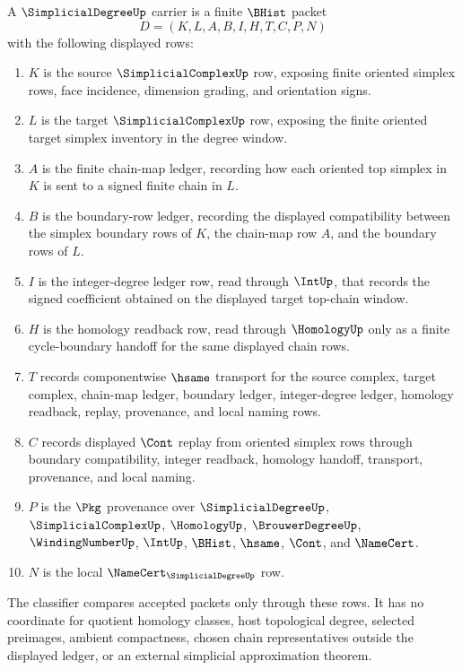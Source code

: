 \begin{definition}
\label{def:simplicial-degree-carrier}
A $\SimplicialDegreeUp$ carrier is a finite $\BHist$ packet
$$
D=(K,L,A,B,I,H,T,C,P,N)
$$
with the following displayed rows:
\begin{enumerate}
\item $K$ is the source $\SimplicialComplexUp$ row, exposing finite oriented simplex rows, face incidence, dimension grading, and orientation signs.
\item $L$ is the target $\SimplicialComplexUp$ row, exposing the finite oriented target simplex inventory in the degree window.
\item $A$ is the finite chain-map ledger, recording how each oriented top simplex in $K$ is sent to a signed finite chain in $L$.
\item $B$ is the boundary-row ledger, recording the displayed compatibility between the simplex boundary rows of $K$, the chain-map row $A$, and the boundary rows of $L$.
\item $I$ is the integer-degree ledger row, read through $\IntUp$, that records the signed coefficient obtained on the displayed target top-chain window.
\item $H$ is the homology readback row, read through $\HomologyUp$ only as a finite cycle-boundary handoff for the same displayed chain rows.
\item $T$ records componentwise $\hsame$ transport for the source complex, target complex, chain-map ledger, boundary ledger, integer-degree ledger, homology readback, replay, provenance, and local naming rows.
\item $C$ records displayed $\Cont$ replay from oriented simplex rows through boundary compatibility, integer readback, homology handoff, transport, provenance, and local naming.
\item $P$ is the $\Pkg$ provenance over $\SimplicialDegreeUp$, $\SimplicialComplexUp$, $\HomologyUp$, $\BrouwerDegreeUp$, $\WindingNumberUp$, $\IntUp$, $\BHist$, $\hsame$, $\Cont$, and $\NameCert$.
\item $N$ is the local $\NameCert_{\SimplicialDegreeUp}$ row.
\end{enumerate}
The classifier compares accepted packets only through these rows. It has no coordinate for quotient homology classes, host topological degree, selected preimages, ambient compactness, chosen chain representatives outside the displayed ledger, or an external simplicial approximation theorem.
\end{definition}

